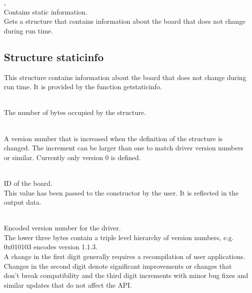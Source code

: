     \deviceindex, \lb{}\\
    Contains static information.\\
    Gets a structure that contains information about the board that does not change during run time.\par



\subsection{Structure \prefix static\tu info}

This structure contains information about the board that does not change during run time. It is provided by the function \textsf{\prefix get\tu static\tu info}.\par

\\
The number of bytes occupied by the structure.

\\
A version number that is increased when the definition of the structure is changed. The increment can be larger than one to match driver version numbers or similar. Currently only version 0 is defined.\par


\\
ID of the board.\\
This value has been passed to the constructor by the user. It is reflected in the output data.\par

\\
Encoded version number for the driver.\\
The lower three bytes contain a triple level hierarchy of version numbers, e.g. 0x010103 encodes version 1.1.3.\\
A change in the first digit generally requires a recompilation of user applications. 
Changes in the second digit denote significant improvements or changes that don't break compatibility 
and the third digit increments with minor bug fixes and similar updates that do not affect the API.\par

